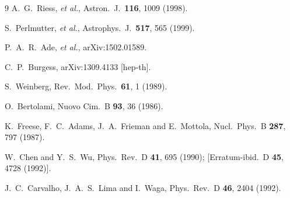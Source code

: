 \documentclass[prd,twocolumn,preprintnumbers,amsmath,amssymb,nofootinbib,english,showpacs]{revtex4-1}
\begin{document}
\begin{thebibliography}{9}
  A.~G.~Riess, {\it et al.},
  Astron.\ J.\ {\bf 116}, 1009 (1998).

  S.~Perlmutter, {\it et al.},
  Astrophys.\ J.\ {\bf 517}, 565 (1999).

   P.~A.~R.~Ade, {\it et al.},
   arXiv:1502.01589.

  C.~P.~Burgess,
  arXiv:1309.4133 [hep-th].

  S.~Weinberg,
  Rev.\ Mod.\ Phys.\  {\bf 61}, 1 (1989).

  O.~Bertolami,
  Nuovo Cim.\ B {\bf 93}, 36 (1986).

  K.~Freese, F.~C.~Adams, J.~A.~Frieman and E.~Mottola,
  Nucl.\ Phys.\ B {\bf 287}, 797 (1987).

  W.~Chen and Y.~S.~Wu,
  Phys.\ Rev.\ D {\bf 41}, 695 (1990); [Erratum-ibid.\ D {\bf 45}, 4728 (1992)].

  J.~C.~Carvalho, J.~A.~S.~Lima and I.~Waga,
  Phys.\ Rev.\ D {\bf 46}, 2404 (1992).


\end{thebibliography}
\end{document}
